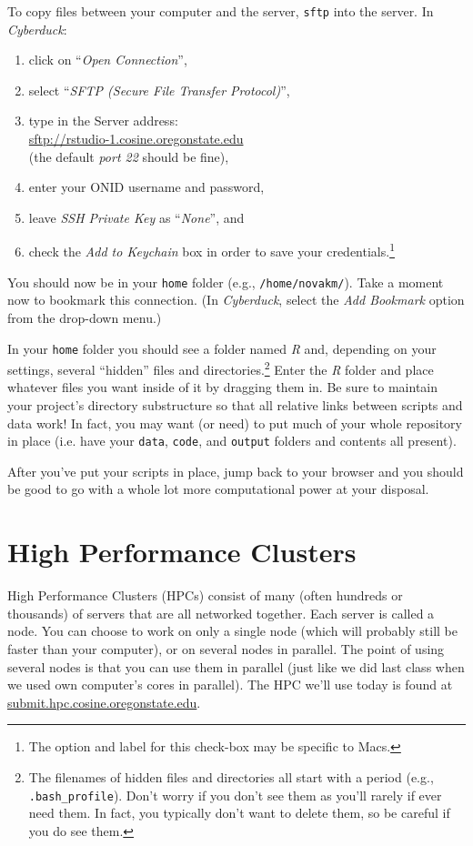 \documentclass[12pt,letterpaper]{article}
\begin{document}
To copy files between your computer and the server, \texttt{sftp} into the server.
In \emph{Cyberduck}:
\begin{enumerate}
	\item click on ``\emph{Open Connection}'',
	\item select ``\emph{SFTP (Secure File Transfer Protocol)}'',
	\item type in the Server address:\\
		 \url{sftp://rstudio-1.cosine.oregonstate.edu}\\
		 (the default \emph{port 22} should be fine),
	\item enter your ONID username and password,
	\item leave \emph{SSH Private Key} as ``\emph{None}'', and
	\item check the \emph{Add to Keychain} box in order to save your credentials.\footnote{The option and label for this check-box may be specific to Macs.}
\end{enumerate}
\noindent
You should now be in your \texttt{home} folder (e.g., \texttt{/home/novakm/}).
Take a moment now to bookmark this connection.
(In \emph{Cyberduck}, select the \emph{Add Bookmark} option from the drop-down menu.)

In your \texttt{home} folder you should see a folder named \emph{R} and, depending on your settings,
several ``hidden'' files and directories.\footnote{The filenames of hidden files and directories all start with a period (e.g., \texttt{.bash\_profile}).
Don't worry if you don't see them as you'll rarely if ever need them.  In fact, you typically don't want to delete them, so be careful if you do see them.}
Enter the \emph{R} folder and place whatever files you want inside of it by dragging them in.
Be sure to maintain your project's directory substructure so that all relative links between scripts and data work!
In fact, you may want (or need) to put much of your whole repository in place (i.e. have your \texttt{data}, \texttt{code}, and \texttt{output} folders and contents all present).


After you've put your scripts in place, jump back to your browser and you should be good to go with a whole lot more computational power at your disposal.


\section{High Performance Clusters}

High Performance Clusters (HPCs) consist of many (often hundreds or thousands) of servers that are all networked together.
Each server is called a node.
You can choose to work on only a single node (which will probably still be faster than your computer), or on several nodes in parallel.
The point of using several nodes is that you can use them in parallel (just like we did last class when we used own computer's cores in parallel).
The HPC we'll use today is found at \url{submit.hpc.cosine.oregonstate.edu}.
\end{document}
